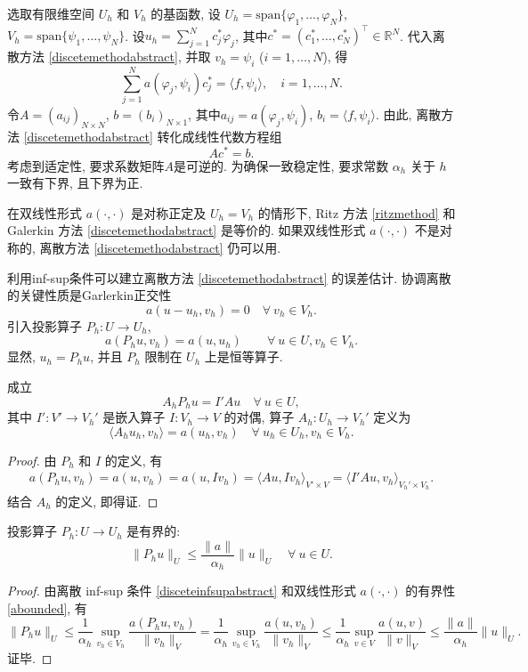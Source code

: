 选取有限维空间 $U_h$ 和 $V_h$ 的基函数, 设 $U_h=\textrm{span}\{\varphi_1,\ldots, \varphi_N\}$, $V_h=\textrm{span}\{\psi_1,\ldots, \psi_N\}$.
设$\displaystyle u_h=\sum_{j=1}^Nc_j^{*}\varphi_j$, 其中$c^{*}=(c_1^{*}, \ldots, c_N^{*})^{\intercal}\in\mathbb R^N$. 
代入离散方法 \eqref{discetemethodabstract}, 并取 $v_h=\psi_i$ ($i=1,\ldots, N$), 得
$$
\sum_{j=1}^Na(\varphi_j, \psi_i)c_j^{*}=\langle f, \psi_i\rangle, \quad i=1,\ldots, N.
$$
令$A=(a_{ij})_{N\times N}$, $b=(b_i)_{N\times1}$, 其中$a_{ij}=a(\varphi_j, \psi_i)$, $b_i=\langle f, \psi_i\rangle$.
由此, 离散方法 \eqref{discetemethodabstract} 转化成线性代数方程组
$$
Ac^{*}=b.
$$
考虑到适定性, 要求系数矩阵$A$是可逆的. 为确保一致稳定性, 要求常数 $\alpha_h$ 关于 $h$ 一致有下界, 且下界为正.

在双线性形式 $a(\cdot,\cdot)$ 是对称正定及 $U_h=V_h$ 的情形下, Ritz 方法 \eqref{ritzmethod} 和 Galerkin 方法 \eqref{discetemethodabstract} 是等价的. 如果双线性形式 $a(\cdot,\cdot)$ 不是对称的, 离散方法 \eqref{discetemethodabstract} 仍可以用. 

利用inf-sup条件可以建立离散方法 \eqref{discetemethodabstract} 的误差估计. 协调离散的关键性质是Garlerkin正交性
\[
a(u-u_h, v_h) = 0\quad \forall~v_h\in V_h.
\]
引入投影算子 $P_h : U\to U_h$, 
\begin{equation*}
a(P_hu, v_h)=a(u,u_h)\qquad\forall~u\in U, v_h\in V_h.
\end{equation*}
显然, $u_h = P_hu$, 并且 $P_h$ 限制在 $U_h$ 上是恒等算子.
\begin{lemma}
成立
\begin{equation*}
A_hP_hu = I'Au\quad\forall~u\in U,
\end{equation*}
其中 $I': V'\to V_h'$ 是嵌入算子 $I: V_h\to V$ 的对偶,  算子 $A_h: U_h\to V_h'$ 定义为
\[
\langle A_hu_h, v_h\rangle=a(u_h, v_h)\quad\forall~u_h\in U_h, v_h\in V_h.
\]
\end{lemma} 
\begin{proof}
由 $P_h$ 和 $I$ 的定义, 有
\begin{align*}
a(P_hu, v_h)=a(u, v_h)=a(u, Iv_h)=\langle Au, Iv_h\rangle_{V'\times V}=\langle I'Au, v_h\rangle_{V_h'\times V_h}.
\end{align*}
结合 $A_h$ 的定义, 即得证.
\end{proof}

\begin{lemma}
投影算子 $P_h : U\to U_h$ 是有界的:
\begin{equation}\label{eq:Phbounded}
\|P_hu\|_U\leq \frac{\|a\|}{\alpha_h}\|u\|_U\quad\forall~u\in U.
\end{equation}
\end{lemma}
\begin{proof}
由离散 inf-sup 条件 \eqref{disceteinfsupabstract} 和双线性形式 $a(\cdot, \cdot)$ 的有界性 \eqref{abounded}, 有
\[
\|P_hu\|_U\leq\frac{1}{\alpha_h}\sup_{v_h\in V_h}\frac{a(P_hu, v_h)}{\|v_h\|_V}=\frac{1}{\alpha_h}\sup_{v_h\in V_h}\frac{a(u, v_h)}{\|v_h\|_V}\leq \frac{1}{\alpha_h}\sup_{v\in V}\frac{a(u, v)}{\|v\|_V}\leq\frac{\|a\|}{\alpha_h}\|u\|_U.
\]
证毕.
\end{proof}

